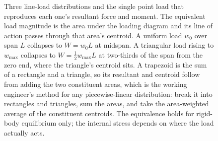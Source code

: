 \begin{figure}[htbp]
\caption[Equivalent point loads for line distributions]{Three line-load
distributions and the single point load that reproduces each one's
resultant force and moment. The equivalent load magnitude is the area
under the loading diagram and its line of action passes through that
area's centroid. A uniform load $w_0$ over span $L$ collapses to
$W=w_0L$ at midspan. A triangular load rising to $w_{\max}$ collapses to
$W=\tfrac12 w_{\max}L$ at two-thirds of the span from the zero end, where
the triangle's centroid sits. A trapezoid is the sum of a rectangle and
a triangle, so its resultant and centroid follow from adding the two
constituent areas, which is the working engineer's method for any
piecewise-linear distribution: break it into rectangles and triangles,
sum the areas, and take the area-weighted average of the constituent
centroids. The equivalence holds for rigid-body equilibrium only; the
internal stress depends on where the load actually acts.}
\label{fig:vol03ch02:distributed-loads}
\end{figure}

